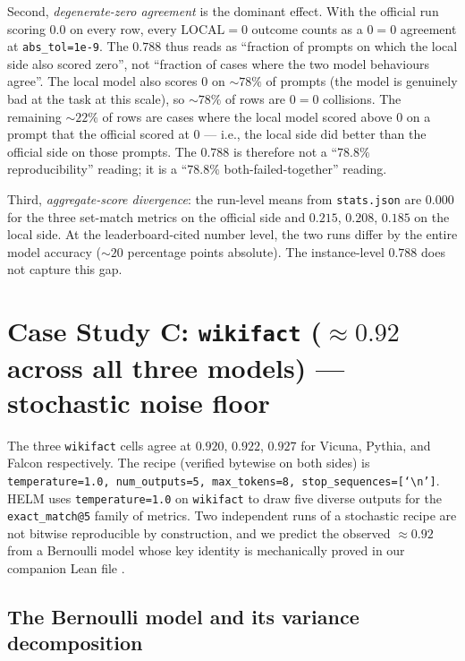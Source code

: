\documentclass[11pt]{article}
\begin{document}
Second, \emph{degenerate-zero agreement} is the dominant effect.
With the official run scoring $0.0$ on every row, every $\text{LOCAL}=0$
  outcome counts as a $0=0$ agreement at \texttt{abs\_tol=1e-9}.
The $0.788$ thus reads as ``fraction of prompts on which the local
  side also scored zero'', not ``fraction of cases where the two model
  behaviours agree''.
The local model also scores $0$ on $\sim 78\%$ of prompts (the model
  is genuinely bad at the task at this scale), so $\sim 78\%$ of
  rows are $0=0$ collisions.
The remaining $\sim 22\%$ of rows are cases where the local model
  scored above $0$ on a prompt that the official scored at $0$ ---
  i.e., the local side did better than the official side on those
  prompts.
The $0.788$ is therefore not a ``$78.8\%$ reproducibility'' reading;
  it is a ``$78.8\%$ both-failed-together'' reading.

Third, \emph{aggregate-score divergence}: the run-level means from
  \texttt{stats.json} are $0.000$ for the three set-match metrics
  on the official side and $0.215$, $0.208$, $0.185$ on the local
  side.
At the leaderboard-cited number level, the two runs differ by the
  entire model accuracy ($\sim 20$ percentage points absolute).
The instance-level $0.788$ does not capture this gap.


\section{Case Study C: \texorpdfstring{\texttt{wikifact} ($\approx 0.92$ across all three models)}{wikifact (approx 0.92 across all three models)} --- stochastic noise floor}
\label{sec:tr-case-c}

The three \texttt{wikifact} cells agree at $0.920$, $0.922$, $0.927$
  for Vicuna, Pythia, and Falcon respectively.
The recipe (verified bytewise on both sides) is
  \texttt{temperature=1.0, num\_outputs=5, max\_tokens=8,
  stop\_sequences=[`\textbackslash n']}.
HELM uses \texttt{temperature=1.0} on \texttt{wikifact} to draw five
  diverse outputs for the \texttt{exact\_match@5} family of metrics.
Two independent runs of a stochastic recipe are not bitwise
  reproducible by construction, and we predict the observed $\approx
  0.92$ from a Bernoulli model whose key identity is mechanically
  proved in our companion Lean file
  .

\subsection{The Bernoulli model and its variance decomposition}
\label{sec:tr-case-c-math}
\end{document}
